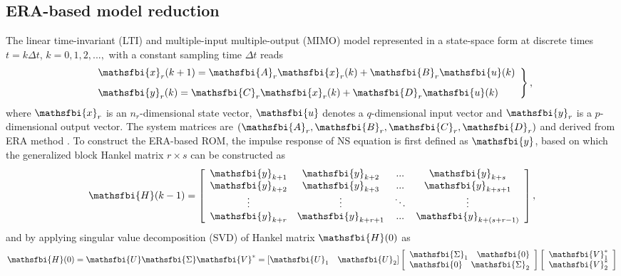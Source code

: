 %
\subsection{ERA-based model reduction}
The linear time-invariant (LTI) and multiple-input multiple-output (MIMO) model represented in a state-space form 
at discrete times $t=k\Delta t$, 
$k=0,1,2,...,$ with a constant sampling time $\Delta t$ reads 
\begin{equation}
\left. \begin{array}{ll}

\displaystyle \mathsfbi{x}_{r}(k+1)=\mathsfbi{A}_{r}\mathsfbi{x}_{r}(k)+\mathsfbi{B}_{r}\mathsfbi{u}(k)  \\[8pt]

\displaystyle \mathsfbi{y}_{r}(k)=\mathsfbi{C}_{r}\mathsfbi{x}_{r}(k)+\mathsfbi{D}_{r}\mathsfbi{u}(k) 
\end{array}\right\},
 \label{eq:ERA_ROM}
\end{equation}  
where $\mathsfbi{x}_r$ is an $n_r$-dimensional state vector, 
$\mathsfbi{u}$ denotes a $q$-dimensional input vector 
and $\mathsfbi{y}_r$ is a $p$-dimensional output vector.  
The system matrices are $\left(\mathsfbi{A}_r,\mathsfbi{B}_r,\mathsfbi{C}_r,\mathsfbi{D}_r\right)$
and derived from ERA method \cite{Juang1985}. 
To construct the ERA-based ROM, 
the impulse response of NS equation is first defined as $\mathsfbi{y}$, based on which
the generalized block Hankel matrix $r \times s$ can be constructed as
\begin{equation}
\mathsfbi{H}(k-1) = 
\left[ {\begin{array}{*{20}c}
    \mathsfbi{y}_{k+1}&     \mathsfbi{y}_{k+2}& ...& \mathsfbi{y}_{k+s}        \\    
    \mathsfbi{y}_{k+2}& \mathsfbi{y}_{k+3}& ...& \mathsfbi{y}_{k+s+1}    \\
    \vdots& \vdots& \ddots& \vdots        \\
    \mathsfbi{y}_{k+r}& \mathsfbi{y}_{k+r+1}& ...&\mathsfbi{y}_{k+(s+r-1)}
 \end{array} } \right],
\label{eq:Hankel}
\end{equation}  
and by applying singular value decomposition (SVD) of Hankel matrix $\mathsfbi{H}(0)$ as
\begin{equation}
\mathsfbi{H}(0) = \mathsfbi{U}\mathsfbi{\Sigma}\mathsfbi{V}^*=
\left[\mathsfbi{U}_1 \quad \mathsfbi{U}_2\right]
\left[{\begin{array}{*{20}c}
   \mathsfbi{\Sigma}_1 \quad \mathsfbi{0} \\
   \mathsfbi{0} \quad \mathsfbi{\Sigma}_2
 \end{array} }
\right]
\left[{\begin{array}{*{20}c}
  \mathsfbi{V}_1^* \\
  \mathsfbi{V}_2^*
 \end{array} }
\right]
\end{equation}
